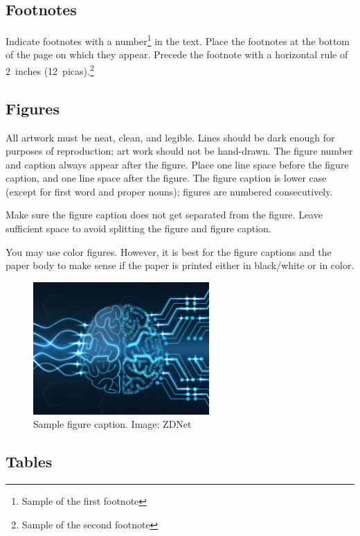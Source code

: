 \documentclass{article} %
\begin{document}
\subsection{Footnotes}

Indicate footnotes with a number\footnote{Sample of the first footnote} in the
text. Place the footnotes at the bottom of the page on which they appear.
Precede the footnote with a horizontal rule of 2~inches
(12~picas).\footnote{Sample of the second footnote}

\subsection{Figures}

All artwork must be neat, clean, and legible. Lines should be dark
enough for purposes of reproduction; art work should not be
hand-drawn. The figure number and caption always appear after the
figure. Place one line space before the figure caption, and one line
space after the figure. The figure caption is lower case (except for
first word and proper nouns); figures are numbered consecutively.

Make sure the figure caption does not get separated from the figure.
Leave sufficient space to avoid splitting the figure and figure caption.

You may use color figures.
However, it is best for the
figure captions and the paper body to make sense if the paper is printed
either in black/white or in color.

\begin{figure}[h]
\begin{center}
\includegraphics[width=0.6\textwidth]{Figs/td-deep-learning.jpg}
\end{center}
\caption{Sample figure caption. Image: ZDNet}
\end{figure}

\subsection{Tables}
\end{document}
